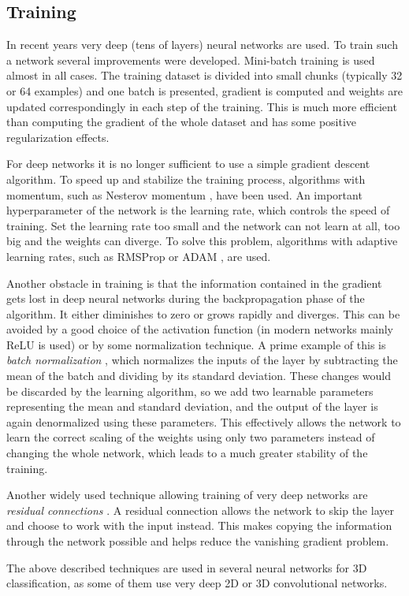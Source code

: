 \subsection{Training}
\label{sec:training}
In recent years very deep (tens of layers) neural networks are used. To train such a network several improvements were developed. Mini-batch training is used almost in all cases. The training dataset is divided into small chunks (typically 32 or 64 examples) and one batch is presented, gradient is computed and weights are updated correspondingly in each step of the training. This is much more efficient than computing the gradient of the whole dataset and has some positive regularization effects. \par
For deep networks it is no longer sufficient to use a simple gradient descent algorithm. To speed up and stabilize the training process, algorithms with momentum, such as Nesterov momentum \cite{sutskever_importance_2013}, have been used. An important hyperparameter of the network is the learning rate, which controls the speed of training. Set the learning rate too small and the network can not learn at all, too big and the weights can diverge. To solve this problem, algorithms with adaptive learning rates, such as 
RMSProp \cite{hinton_neural_nodate} or ADAM \cite{kingma_adam:_2014}, are used. \par
Another obstacle in training is that the information contained in the gradient gets lost in deep neural networks during the backpropagation phase of the algorithm. It either diminishes to zero or grows rapidly and diverges. This can be avoided by a good choice of the activation function (in modern networks mainly ReLU is used) or by some normalization technique. A prime example of this is \textit{batch normalization} \cite{ioffe_batch_2015}, which normalizes the inputs of the layer by subtracting the mean of the batch and dividing by its standard deviation. These changes would be discarded by the learning algorithm, so we add two learnable parameters representing the mean and standard deviation, and the output of the layer is again denormalized using these parameters. This effectively allows the network to learn the correct scaling of the weights using only two parameters instead of changing the whole network, which leads to a much greater stability of the training.\par
Another widely used technique allowing training of very deep networks are \textit{residual connections} \cite{szegedy_inception-v4_2016}. A residual connection allows the network to skip the layer and choose to work with the input instead. This makes copying the information through the network possible and helps reduce the vanishing gradient problem. \par
The above described techniques are used in several neural networks for 3D classification, as some of them use very deep 2D or 3D convolutional networks.

